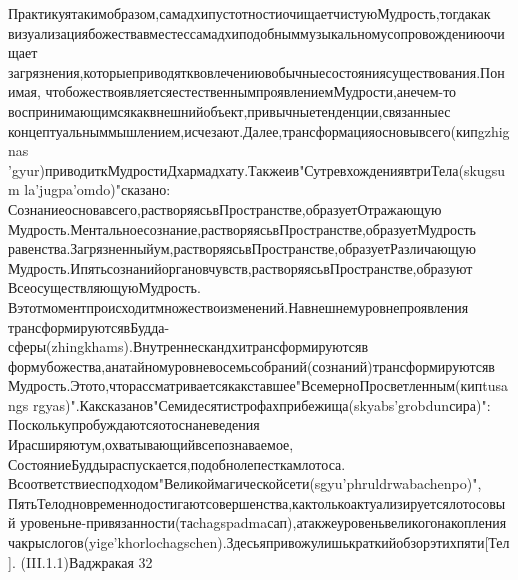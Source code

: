Практикуятакимобразом,самадхипустотностиочищаетчистуюМудрость,тогдакак
визуализациябожествавместессамадхиподобныммузыкальномусопровождениюочищает
загрязнения,которыеприводятквовлечениювобычныесостояниясуществования.Понимая,
чтобожествоявляетсяестественнымпроявлениемМудрости,анечем-то
воспринимающимсякаквнешнийобъект,привычныетенденции,связанныес
концептуальныммышлением,исчезают.Далее,трансформацияосновывсего(кипgzhignas
’gyur)приводиткМудростиДхармадхату.Такжеив"СутревхождениявтриТела(skugsum
la'jugpa’omdo)"сказано:
Сознаниеосновавсего,растворяясьвПространстве,образуетОтражающую
Мудрость.Ментальноесознание,растворяясьвПространстве,образуетМудрость
равенства.Загрязненныйум,растворяясьвПространстве,образуетРазличающую
Мудрость.Ипятьсознанийоргановчувств,растворяясьвПространстве,образуют
ВсеосуществляющуюМудрость.
Вэтотмоментпроисходитмножествоизменений.Навнешнемуровнепроявления
трансформируютсявБудда-сферы(zhingkhams).Внутреннескандхитрансформируютсяв
формубожества,анатайномуровневосемьсобраний(сознаний)трансформируютсяв
Мудрость.Этото,чторассматриваетсякакставшее"ВсемерноПросветленным(кипtusangs
rgyas)".Каксказанов"Семидесятистрофахприбежища(skyabs'grobdunсира)":
Посколькупробуждаютсяотоснаневедения
Ирасширяютум,охватывающийвсепознаваемое,
СостояниеБуддыраспускается,подобнолепесткамлотоса.
Всоответствиесподходом"Великоймагическойсети(sgyu'phruldrwabachenpo)",
ПятьТелодновременнодостигаютсовершенства,кактолькоактуализируетсялотосовый
уровеньне-привязанности(таchagspadmaсап),атакжеуровеньвеликогонакопления
чакрыслогов(yige'khorlochagschen).Здесьяпривожулишькраткийобзорэтихпяти[Тел].
(III.1.1)Ваджракая
32